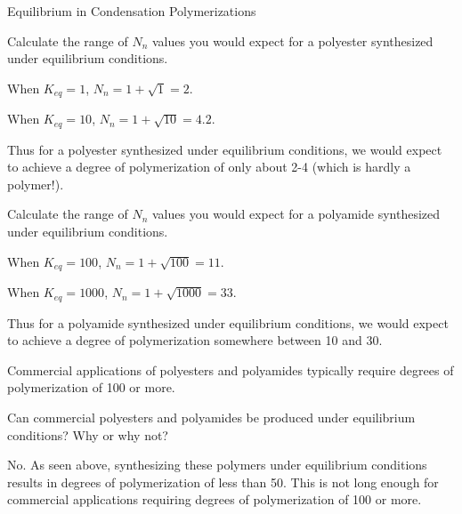 \begin{activity}{Equilibrium in Condensation Polymerizations}
\begin{ctqs}
		\question Calculate the range of $N_n$ values you would expect for a polyester synthesized under equilibrium conditions.
		
			\begin{solution}[2in]
			
				When $K_{eq}=1$, $N_n = 1+ \sqrt{1} = 2$.
			
				When $K_{eq}=10$, $N_n = 1+ \sqrt{10} = 4.2$.
				
				Thus for a polyester synthesized under equilibrium conditions, we would expect to achieve a degree of polymerization of only about 2-4 (which is hardly a polymer!).			
			
			\end{solution}
		
		\question Calculate the range of $N_n$ values you would expect for a polyamide synthesized under equilibrium conditions.
		
			\begin{solution}[2in]
			
				When $K_{eq}=100$, $N_n = 1+ \sqrt{100} = 11$.
			
				When $K_{eq}=1000$, $N_n = 1+ \sqrt{1000} = 33$.
				
				Thus for a polyamide synthesized under equilibrium conditions, we would expect to achieve a degree of polymerization somewhere between 10 and 30.
			\end{solution}
		
\end{ctqs}

\begin{infobox}

	Commercial applications of polyesters and polyamides typically require degrees of polymerization of 100 or more.  

\end{infobox}

\begin{ctqs}
		
		\question Can commercial polyesters and polyamides be produced under equilibrium conditions?  Why or why not?
		
			\begin{solution}[2in]
			
				No. As seen above, synthesizing these polymers under equilibrium conditions results in degrees of polymerization of less than 50.  This is not long enough for commercial applications requiring degrees of polymerization of 100 or more.
			

\end{solution}
\end{ctqs}
\end{activity}
